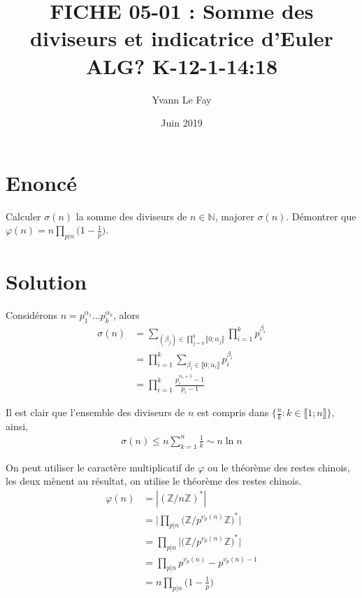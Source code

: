 \documentclass{article}
\begin{document}
\title{FICHE 05-01 : Somme des diviseurs et indicatrice d'Euler ALG? K-12-1-14:18}
\author{Yvann Le Fay}
\date{Juin 2019}
\maketitle

\section*{Enoncé}
Calculer $\sigma(n)$ la somme des diviseurs de $n\in \mathbb{N}$, majorer $\sigma(n)$. Démontrer que $\varphi(n) = \displaystyle n\prod_{p|n}\bigg(1-\frac{1}{p}\bigg)$.
\section*{Solution}
Considérons $n=p_1^{\alpha_1}\ldots p_k^{\alpha_k}$, alors
\begin{align*}
\sigma(n) &= \sum_{(\beta_j)\in \prod_{j=0}^{k}\llbracket 0;\alpha_j\rrbracket}\prod_{i=1}^k p_i^{\beta_i}\\
&=\prod_{i=1}^k \sum_{\beta_i\in\llbracket 0;\alpha_i\rrbracket}{p_i^{\beta_i}}\\
&=\prod_{i=1}^k \frac{p_i^{\alpha_i+1}-1}{p_i-1}
\end{align*}

Il est clair que l'ensemble des diviseurs de $n$ est compris dans $\{\frac{n}{k} : k\in\llbracket 1;n\rrbracket\}$, ainsi, 
\begin{align*}
\sigma(n)\leq n\sum_{k=1}^n \frac{1}{k}\sim n \ln{n}
\end{align*}

On peut utiliser le caractère multiplicatif de $\varphi$ ou le théorème des restes chinois, les deux mènent au résultat, on utilise le théorème des restes chinois. 
\begin{align*}
\varphi(n) &= |(\mathbb{Z}/{n\mathbb{Z}})^*|\\
&= \bigg|\prod_{p|n}\bigg(\mathbb{Z}/{p^{v_p(n)}\mathbb{Z}}\bigg)^*\bigg|\\
&=\prod_{p|n}\bigg|\bigg(\mathbb{Z}/{p^{v_p(n)}\mathbb{Z}}\bigg)^*\bigg|\\
&=\prod_{p|n}p^{v_p(n)}-p^{v_p(n)-1}\\
&=n\prod_{p|n}\bigg(1-\frac{1}{p}\bigg)
\end{align*}
\end{document}
